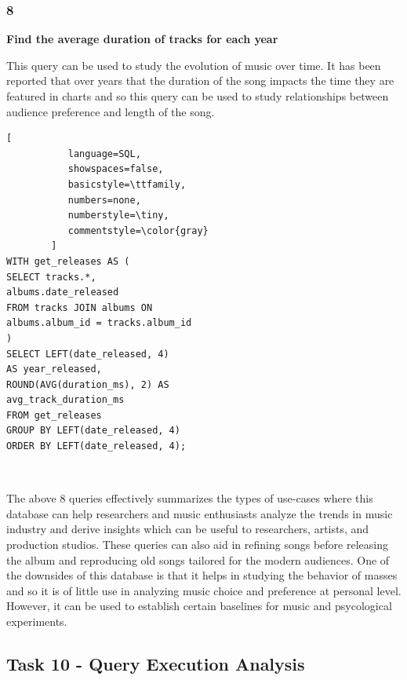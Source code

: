 \documentclass[conference]{IEEEtran}
\begin{document}
\subsubsection*{8} \textbf{Find the average duration of tracks for each year}

This query can be used to study the evolution of music over time. It has been reported that over years \cite{b3} \cite{b4} \cite{b5} that the duration of the song impacts the time they are featured in charts and so this query can be used to study relationships between audience preference and length of the song. \linebreak

\begin{lstlisting}[
           language=SQL,
           showspaces=false,
           basicstyle=\ttfamily,
           numbers=none,
           numberstyle=\tiny,
           commentstyle=\color{gray}
        ]
WITH get_releases AS (
SELECT tracks.*,
albums.date_released
FROM tracks JOIN albums ON 
albums.album_id = tracks.album_id
)
SELECT LEFT(date_released, 4) 
AS year_released, 
ROUND(AVG(duration_ms), 2) AS 
avg_track_duration_ms
FROM get_releases
GROUP BY LEFT(date_released, 4)
ORDER BY LEFT(date_released, 4);
\end{lstlisting} \ 

The above 8 queries effectively summarizes the types of use-cases where this database can help researchers and music enthusiasts analyze the trends in music industry and derive insights which can be useful to researchers, artists, and production studios. These queries can also aid in refining songs before releasing the album and reproducing old songs tailored for the modern audiences. \linebreak One of the downsides of this database is that it helps in studying the behavior of masses and so it is of little use in analyzing music choice and preference at personal level. However, it can be used to establish certain baselines for music and psycological experiments.

\subsection{\textbf{Task 10} - Query Execution Analysis}
\end{document}
